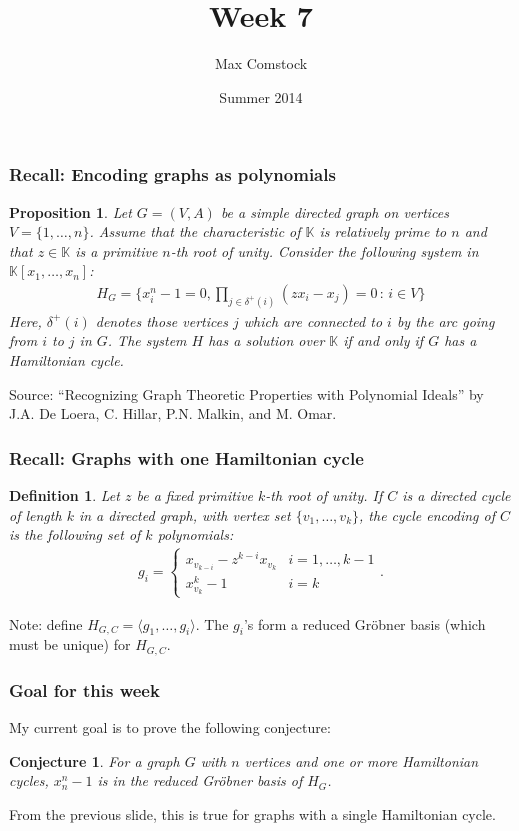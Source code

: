 \documentclass{beamer}
\title{Week 7}
\author{Max Comstock}
\date{Summer 2014}
\newtheorem{conjecture}{Conjecture}
\newtheorem{prop}{Proposition}
\newtheorem{defin}{Definition}
\begin{document}
\frame{\titlepage}

\begin{frame}
\frametitle{Recall: Encoding graphs as polynomials}
\begin{prop}
  Let $G = (V,A)$ be a simple directed graph on vertices $V = \{1, \ldots, n\}$. Assume that the characteristic of $\mathbb{K}$ is relatively prime to $n$ and that $z \in \mathbb{K}$ is a primitive $n$-th root of unity. Consider the following system in $\mathbb{K}[x_1, \ldots, x_n]$:
  \begin{align*}
    H_G = \{x_i^n - 1 = 0, \prod_{j \in \delta^+(i)} (z x_i - x_j) = 0 \, : \, i \in V\}
  \end{align*}
  Here, $\delta^+(i)$ denotes those vertices $j$ which are connected to $i$ by the arc going from $i$ to $j$ in $G$. The system $H$ has a solution over $\mathbb{K}$ if and only if $G$ has a Hamiltonian cycle.
\end{prop}
Source: ``Recognizing Graph Theoretic Properties with Polynomial Ideals'' by J.A. De Loera, C. Hillar, P.N. Malkin, and M. Omar.
\end{frame}

\begin{frame}
\frametitle{Recall: Graphs with one Hamiltonian cycle}
\begin{defin}
  Let $z$ be a fixed primitive $k$-th root of unity. If $C$ is a directed cycle of length $k$ in a directed graph, with vertex set $\{v_1, \ldots, v_k\}$, the cycle encoding of $C$ is the following set of $k$ polynomials:
  \begin{align*}
    g_i = \left \{ \begin{matrix} x_{v_{k-i}} - z^{k-i} x_{v_k} & i = 1, \ldots, k-1\\ x_{v_k}^k - 1 & i = k \end{matrix} \right ..
  \end{align*}
\end{defin}
Note: define $H_{G,C} = \langle g_1, \ldots, g_i \rangle$. The $g_i$'s form a reduced Gr\"obner basis (which must be unique) for $H_{G,C}$.
\end{frame}

\begin{frame}
\frametitle{Goal for this week}
My current goal is to prove the following conjecture:
\begin{conjecture}
	For a graph $G$ with $n$ vertices and one or more Hamiltonian cycles, $x_n^n - 1$ is in the reduced Gr\"obner basis of $H_G$.
\end{conjecture}
From the previous slide, this is true for graphs with a single Hamiltonian cycle.
\end{frame}
\end{document}
